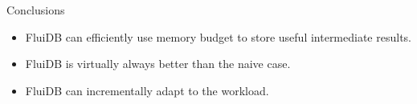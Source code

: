 \begin{frame}{Conclusions}
  \begin{itemize}
  \item FluiDB can efficiently use memory budget to store useful
    intermediate results.
  \item FluiDB is virtually always better than the naive case.
  \item FluiDB can incrementally adapt to the workload.
  \end{itemize}
\end{frame}
